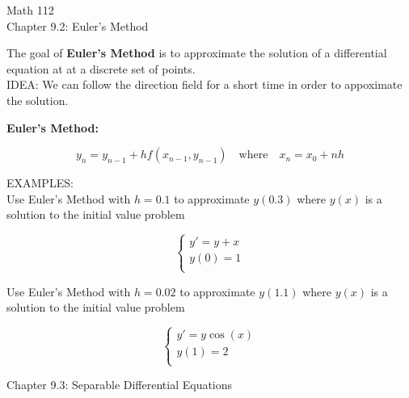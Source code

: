 \documentclass[11pt]{article}
\begin{document}
\begin{center}
\Large
\rm{Math 112}
\\
\rm{Chapter 9.2:  Euler's Method}\\

\end{center}
\vspace{0.2in}

\vspace{0.2in}

The goal of {\bf Euler's Method} is to approximate the solution of a differential equation at
at a discrete set of points.  \\

IDEA:  We can follow the direction field for a short time in order to appoximate the solution.

\vspace{6in}

    {\bf Euler's Method:}

\begin{displaymath}
  y_n = y_{n-1} + hf(x_{n-1},y_{n-1})\quad \mbox{where}\quad x_n=x_0+nh
\end{displaymath}

\pagebreak
EXAMPLES:\\

Use Euler's Method with $h=0.1$ to approximate $y(0.3)$ where $y(x)$ is a solution to the
initial value problem

\begin{displaymath}
  \left\{ \begin{array}{ll}
  y' = y + x\\
y(0) = 1 \\
\end{array} \right.
\end{displaymath}

\vspace{3.25in}

Use Euler's Method with $h=0.02$ to approximate $y(1.1)$ where $y(x)$ is a solution to the
initial value problem

\begin{displaymath}
  \left\{ \begin{array}{ll}
  y' = y\cos(x)\\
y(1) = 2 \\
\end{array} \right.
\end{displaymath}

\vspace{0.8in}
\pagebreak
\begin{center}
\Large
\rm{Chapter 9.3:  Separable Differential Equations}\\

\end{center}
\end{document}
